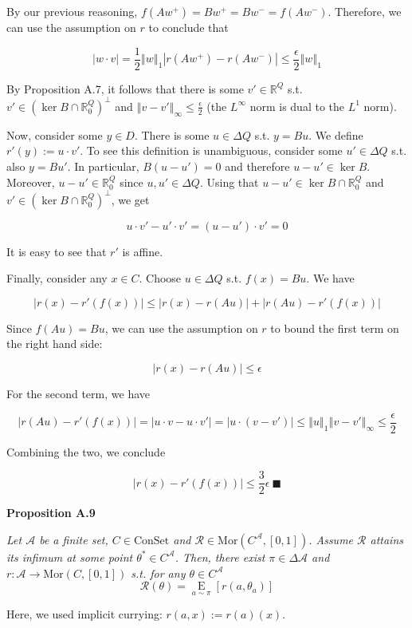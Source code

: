 \documentclass[a4paper]{article}
\newcommand{\Co}[1]{}
\newcommand{\AP}[1]{\left(#1\right)}
\newcommand{\AB}[1]{\left[#1\right]}
\newcommand{\Ea}[2]{\underset{#1}{\operatorname{E}}\AB{#2}}
\newcommand{\Reals}{\mathbb{R}}
\DeclareMathOperator{\Ker}{ker}
\newcommand{\Mor}{\mathrm{Mor}}
\newcommand{\Abs}[1]{\left\vert #1 \right\vert}
\newcommand{\Norm}[1]{\left\Vert #1 \right\Vert}
\newcommand{\A}{\mathcal{A}}
\newcommand{\R}{\mathcal{R}}
\newcommand{\Con}{{\boldsymbol{\mathrm{ConSet}}}}
\begin{document}
By our previous reasoning, $f\AP{Aw^+}=Bw^+=Bw^-=f\AP{Aw^-}$. Therefore, we can use the assumption on $r$ to conclude that

$$\Abs{w\cdot v}=\frac{1}{2}\Norm{w}_1\Abs{r\AP{Aw^+}-r\AP{Aw^-}}\leq\frac{\epsilon}{2}\Norm{w}_1$$

By Proposition A.7, it follows that there is some $v'\in\Reals^Q$ s.t. $v'\in\AP{\Ker B\cap\Reals^Q_0}^\bot$ and $\Norm{v-v'}_\infty\leq\frac{\epsilon}{2}$ (the $L^\infty$ norm is dual to the $L^1$ norm). 

Now, consider some $y\in D$. There is some $u\in\Delta Q$ s.t. $y=Bu$. We define $r'(y):=u\cdot v'$. To see this definition is unambiguous, consider some $u'\in\Delta Q$ s.t. also $y=Bu'$. In particular, $B\AP{u-u'}=0$ and therefore $u-u'\in\Ker B$. Moreover, $u-u'\in\Reals^Q_0$ since $u,u'\in\Delta Q$. Using that $u-u'\in\Ker B\cap\Reals^Q_0$ and $v'\in\AP{\Ker B\cap\Reals^Q_0}^\bot$, we get

$$u\cdot v'-u'\cdot v'=\AP{u-u'}\cdot v'=0$$

It is easy to see that $r'$ is affine. 

Finally, consider any $x\in C$. Choose $u\in\Delta Q$ s.t. $f(x)=Bu$. We have

$$\Big\lvert{r(x)-r'\AP{f(x)}}\Big\rvert\leq\Big\lvert{r(x)-r\AP{Au}}\Big\rvert+\Abs{r\AP{Au}-r'\AP{f(x)}}$$

Since $f\AP{Au}=Bu$, we can use the assumption on $r$ to bound the first term on the right hand side:

$$\Big\lvert{r(x)-r\AP{Au}}\Big\rvert\leq\epsilon$$

For the second term, we have

$$\Abs{r\AP{Au}-r'\AP{f(x)}}=\Big\lvert{u\cdot v-u\cdot v'}\Big\rvert=\Big\lvert{u\cdot\AP{v-v'}}\Big\rvert\leq\Norm{u}_1\Norm{v-v'}_\infty\leq\frac{\epsilon}{2}$$

Combining the two, we conclude

$$\Big\lvert{r(x)-r'\AP{f(x)}}\Big\rvert\leq\frac{3}{2}\epsilon\ \blacksquare$$

\textbf{Proposition A.9}\Co{b}

\textit{Let $\A$ be a finite set, $C\in\Con$ and $\R\in\Mor\AP{C^\A,[0,1]}$. Assume $\R$ attains its infimum at some point $\theta^*\in C^\A$. Then, there exist $\pi\in\Delta\A$ and $r:\A\rightarrow\Mor\AP{C,[0,1]}$ s.t. for any $\theta\in C^\A$}\Co{i} 
$$\R(\theta)=\Ea{a\sim\pi}{r\AP{a,\theta_a}}$$

Here, we used implicit currying: $r(a,x):=r(a)(x)$.
\end{document}
